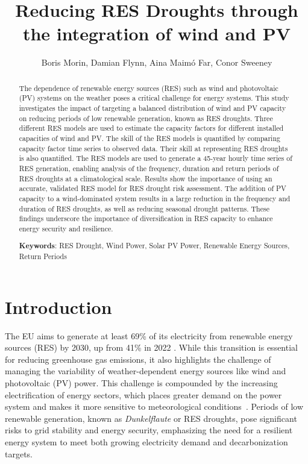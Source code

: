 \documentclass[a4paper, 11pt]{article}
\title{Reducing RES Droughts through the integration of wind and PV}
\author{Boris Morin, Damian Flynn, Aina Maimó Far, Conor Sweeney}
\begin{document}
\maketitle

\begin{abstract}

\noindent The dependence of renewable energy sources (RES) such as wind and photovoltaic (PV) systems on the weather poses a critical challenge for energy systems. This study investigates the impact of targeting a balanced distribution of wind and PV capacity on reducing periods of low renewable generation, known as RES droughts. Three different RES models are used to estimate the capacity factors for different installed capacities of wind and PV. The skill of the RES models is quantified by comparing capacity factor time series to observed data. Their skill at representing RES droughts is also quantified. The RES models are used to generate a 45-year hourly time series of RES generation, enabling analysis of the frequency, duration and return periods of RES droughts at a climatological scale. Results show the importance of using an accurate, validated RES model for RES drought risk assessment. The addition of PV capacity to a wind-dominated system results in a large reduction in the frequency and duration of RES droughts, as well as reducing seasonal drought patterns. These findings underscore the importance of diversification in RES capacity to enhance energy security and resilience.

\textbf{Keywords}: RES Drought, Wind Power, Solar PV Power, Renewable Energy Sources, Return Periods
\end{abstract}

\section{Introduction}
\label{sec:Intro}

The EU aims to generate at least 69\% of its electricity from renewable energy sources (RES) by 2030, up from 41\% in 2022 \cite{eurostat2023share}. While this transition is essential for reducing greenhouse gas emissions, it also highlights the challenge of managing the variability of weather-dependent energy sources like wind and photovoltaic (PV) power. This challenge is compounded by the increasing electrification of energy sectors, which places greater demand on the power system and makes it more sensitive to meteorological conditions~\cite{bloomfield2021, bloomfield2016, vanderWiel2019drought}. Periods of low renewable generation, known as \textit{Dunkelflaute} or RES droughts, pose significant risks to grid stability and energy security, emphasizing the need for a resilient energy system to meet both growing electricity demand and decarbonization targets.
\end{document}
